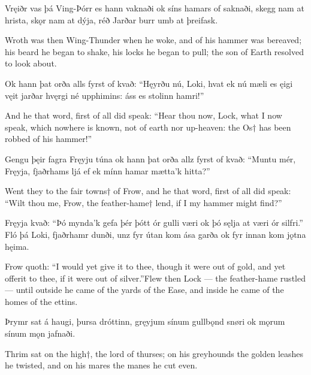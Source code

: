 Vręiðr vas þá Ving-Þórr \hld es hann vaknaði
ok síns hamars \hld of saknaði,
skegg nam at hrista, \hld skǫr nam at dýja,
réð Jarðar burr \hld umb at þreifask.

Wroth was then Wing-Thunder when he woke, and of his hammer was bereaved; his beard he began to shake, his locks he began to pull; the son of Earth resolved to look about.

Ok hann þat orða \hld alls fyrst of kvað:
“Hęyrðu nú, Loki, \hld hvat ek nú mæli
es ęigi vęit \hld jarðar hvęrgi
né upphimins: \hld áss es stolinn hamri!”

And he that word, first of all did speak: “Hear thou now, Lock, what I now speak, which nowhere is known, not of earth nor up-heaven: the Os† has been robbed of his hammer!”

Gengu þęir fagra \hld Fręyju túna
ok hann þat orða \hld allz fyrst of kvað:
“Muntu mér, Fręyja, \hld fjaðrhams ljá
ef ek mínn hamar \hld mætta’k hitta?”

Went they to the fair towns† of Frow, and he that word, first of all did speak: “Wilt thou me, Frow, the feather-hame† lend, if I my hammer might find?”

Fręyja kvað:
“Þó mynda’k gefa þér \hld þótt ór gulli væri
ok þó sęlja \hld at væri ór silfri.”
Fló þá Loki, \hld fjaðrhamr dunði,
unz fyr útan kom \hld ása garða
ok fyr innan kom \hld jǫtna hęima. 

Frow quoth:
“I would yet give it to thee, though it were out of gold, and yet offer\footnotemark[1] it to thee, if it were out of silver.”\footnotemark[2] Flew then Lock — the feather-hame rustled — until outside he came of the yards of the Ease, and inside he came of the homes of the ettins.\footnotemark[3]

Þrymr sat á haugi, \hld þursa dróttinn,
gręyjum sínum \hld gullbǫnd snøri
ok mǫrum sínum \hld mǫn jafnaði. 

Thrim sat on the high†, the lord of thurses; on his greyhounds the golden leashes he twisted, and on his mares the manes he cut even.

